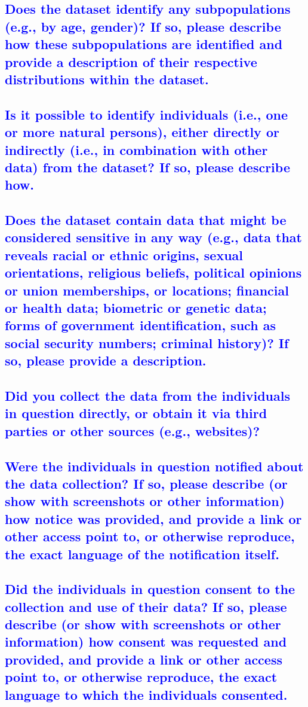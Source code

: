\documentclass[letterpaper, 10 pt, conference]{ieeeconf}  %
\begin{document}
\textcolor{blue}{\subsection{Does the dataset identify any subpopulations (e.g., by age, gender)?
If so, please describe how these subpopulations are identified and provide
a description of their respective distributions within the dataset.}}
\lipsum[1]

\textcolor{blue}{\subsection{Is it possible to identify individuals (i.e., one or more natural persons), either directly or indirectly (i.e., in combination with other
data) from the dataset? If so, please describe how.}}
\lipsum[1]

\textcolor{blue}{\subsection{Does the dataset contain data that might be considered sensitive in
any way (e.g., data that reveals racial or ethnic origins, sexual orientations, religious beliefs, political opinions or union memberships, or
locations; financial or health data; biometric or genetic data; forms of
government identification, such as social security numbers; criminal
history)? If so, please provide a description.}}
\lipsum[1]

\textcolor{blue}{\subsection{Did you collect the data from the individuals in question directly, or
obtain it via third parties or other sources (e.g., websites)?}}
\lipsum[1]

\textcolor{blue}{\subsection{Were the individuals in question notified about the data collection?
If so, please describe (or show with screenshots or other information) how
notice was provided, and provide a link or other access point to, or otherwise reproduce, the exact language of the notification itself.}}
\lipsum[1]

\textcolor{blue}{\subsection{Did the individuals in question consent to the collection and use of
their data? If so, please describe (or show with screenshots or other
information) how consent was requested and provided, and provide a link
or other access point to, or otherwise reproduce, the exact language to
which the individuals consented.}}
\lipsum[1]
\end{document}
